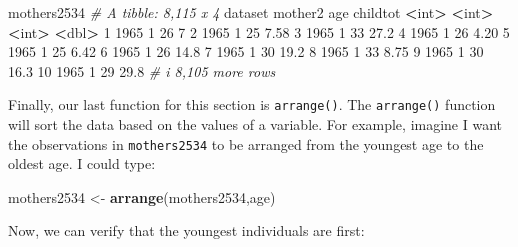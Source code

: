 \documentclass[
]{book}
\newenvironment{Shaded}{\begin{snugshade}}{\end{snugshade}}
\newcommand{\CommentTok}[1]{\textcolor[rgb]{0.56,0.35,0.01}{\textit{#1}}}
\newcommand{\DecValTok}[1]{\textcolor[rgb]{0.00,0.00,0.81}{#1}}
\newcommand{\ErrorTok}[1]{\textcolor[rgb]{0.64,0.00,0.00}{\textbf{#1}}}
\newcommand{\FloatTok}[1]{\textcolor[rgb]{0.00,0.00,0.81}{#1}}
\newcommand{\FunctionTok}[1]{\textcolor[rgb]{0.13,0.29,0.53}{\textbf{#1}}}
\newcommand{\NormalTok}[1]{#1}
\newcommand{\OtherTok}[1]{\textcolor[rgb]{0.56,0.35,0.01}{#1}}
\newcommand{\SpecialCharTok}[1]{\textcolor[rgb]{0.81,0.36,0.00}{\textbf{#1}}}
\begin{document}
\begin{Shaded}
\begin{Highlighting}[]
\NormalTok{mothers2534}
\CommentTok{\# A tibble: 8,115 x 4}
\NormalTok{   dataset mother2   age childtot}
     \SpecialCharTok{\textless{}}\NormalTok{int}\SpecialCharTok{\textgreater{}}   \ErrorTok{\textless{}}\NormalTok{int}\SpecialCharTok{\textgreater{}} \ErrorTok{\textless{}}\NormalTok{int}\SpecialCharTok{\textgreater{}}    \ErrorTok{\textless{}}\NormalTok{dbl}\SpecialCharTok{\textgreater{}}
 \DecValTok{1}    \DecValTok{1965}       \DecValTok{1}    \DecValTok{26}     \DecValTok{7}   
 \DecValTok{2}    \DecValTok{1965}       \DecValTok{1}    \DecValTok{25}     \FloatTok{7.58}
 \DecValTok{3}    \DecValTok{1965}       \DecValTok{1}    \DecValTok{33}    \FloatTok{27.2} 
 \DecValTok{4}    \DecValTok{1965}       \DecValTok{1}    \DecValTok{26}     \FloatTok{4.20}
 \DecValTok{5}    \DecValTok{1965}       \DecValTok{1}    \DecValTok{25}     \FloatTok{6.42}
 \DecValTok{6}    \DecValTok{1965}       \DecValTok{1}    \DecValTok{26}    \FloatTok{14.8} 
 \DecValTok{7}    \DecValTok{1965}       \DecValTok{1}    \DecValTok{30}    \FloatTok{19.2} 
 \DecValTok{8}    \DecValTok{1965}       \DecValTok{1}    \DecValTok{33}     \FloatTok{8.75}
 \DecValTok{9}    \DecValTok{1965}       \DecValTok{1}    \DecValTok{30}    \FloatTok{16.3} 
\DecValTok{10}    \DecValTok{1965}       \DecValTok{1}    \DecValTok{29}    \FloatTok{29.8} 
\CommentTok{\# i 8,105 more rows}
\end{Highlighting}
\end{Shaded}

Finally, our last function for this section is \texttt{arrange()}. The \texttt{arrange()} function will sort the data based on the values of a variable. For example, imagine I want the observations in \texttt{mothers2534} to be arranged from the youngest age to the oldest age. I could type:

\begin{Shaded}
\begin{Highlighting}[]
\NormalTok{mothers2534 }\OtherTok{\textless{}{-}} \FunctionTok{arrange}\NormalTok{(mothers2534,age)}
\end{Highlighting}
\end{Shaded}

Now, we can verify that the youngest individuals are first:

\begin{Shaded}
\end{Shaded}
\end{document}
